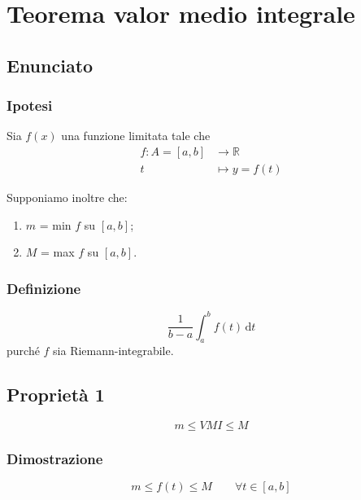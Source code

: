 \documentclass[../dimostrazioni]{subfiles}
\begin{document}
    \chapter{Teorema valor medio integrale}
    \label{teoValorMedioIntegrale}

    \section*{Enunciato}

        \subsection*{Ipotesi}

            Sia \(f(x)\) una funzione limitata tale che
            \begin{align*}
                f : A = [a, b] &\longrightarrow \mathbb{R}\\
                t &\longmapsto y = f(t) 
            \end{align*}

            Supponiamo inoltre che:

                \begin{enumerate}
                    \indentitem \item \(m\) = min \(f\) su \([a, b]\);
                    \indentitem \item \(M\) = max \(f\) su \([a, b]\).
                \end{enumerate}  

        \subsection*{Definizione}

            \[ \frac{1}{b-a} \int_{a}^{b} \! f(t) \, \mathrm{d} t \]
            purché \(f\) sia Riemann-integrabile.

    \section*{Proprietà 1}

        \[ m \leqslant VMI \leqslant M \]

        \subsection*{Dimostrazione}
    
            \[m \leqslant f(t) \leqslant M  \qquad \forall t \in [a, b] \]
\end{document}
